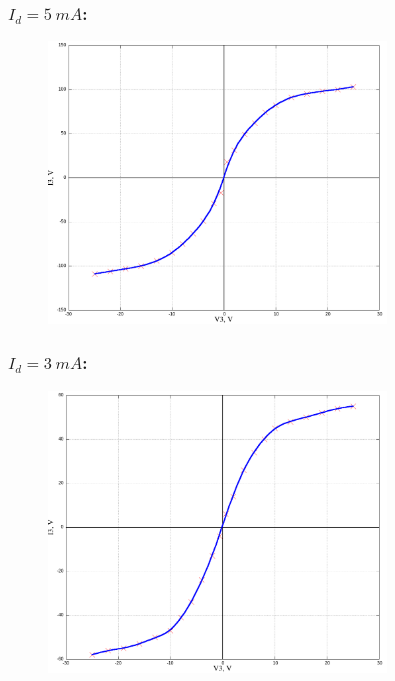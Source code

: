 \documentclass{article}
\begin{document}
\subsubsection*{\(I_d = 5\: mA\):}
\begin{figure}[H]
    \centering
    \includegraphics[width=0.8\textwidth]{V-A-5.png}
\end{figure}

\subsubsection*{\(I_d = 3\: mA\):}
\begin{figure}[H]
    \centering
    \includegraphics[width=0.8\textwidth]{V-A-3.png}
\end{figure}
\end{document}
